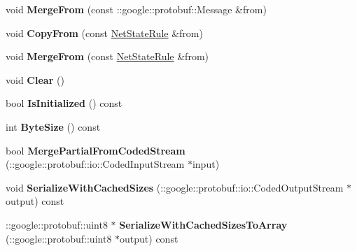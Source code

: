 \begin{DoxyCompactItemize}
void {\bfseries Merge\+From} (const \+::google\+::protobuf\+::\+Message \&from)
\item 
\mbox{\label{classcaffe_1_1_net_state_rule_a3048792ef3e75b81e466f8077213fba8}} 
void {\bfseries Copy\+From} (const \mbox{\hyperlink{classcaffe_1_1_net_state_rule}{Net\+State\+Rule}} \&from)
\item 
\mbox{\label{classcaffe_1_1_net_state_rule_a1fd3a109c8773f2be90f03468345856c}} 
void {\bfseries Merge\+From} (const \mbox{\hyperlink{classcaffe_1_1_net_state_rule}{Net\+State\+Rule}} \&from)
\item 
\mbox{\label{classcaffe_1_1_net_state_rule_a57622cba94a5ee5f78dbf04a33a02be3}} 
void {\bfseries Clear} ()
\item 
\mbox{\label{classcaffe_1_1_net_state_rule_ae839894e8e873564b8bace2cecdd16d7}} 
bool {\bfseries Is\+Initialized} () const
\item 
\mbox{\label{classcaffe_1_1_net_state_rule_ada1c84a2a56b7128d533401370e6dcd1}} 
int {\bfseries Byte\+Size} () const
\item 
\mbox{\label{classcaffe_1_1_net_state_rule_ae713924a94414953f545e076532ba1b8}} 
bool {\bfseries Merge\+Partial\+From\+Coded\+Stream} (\+::google\+::protobuf\+::io\+::\+Coded\+Input\+Stream $\ast$input)
\item 
\mbox{\label{classcaffe_1_1_net_state_rule_a0c123cc511c52b810872514165fec06a}} 
void {\bfseries Serialize\+With\+Cached\+Sizes} (\+::google\+::protobuf\+::io\+::\+Coded\+Output\+Stream $\ast$output) const
\item 
\mbox{\label{classcaffe_1_1_net_state_rule_acd7aca0b7c55ed4c0620b5b3e0c84720}} 
\+::google\+::protobuf\+::uint8 $\ast$ {\bfseries Serialize\+With\+Cached\+Sizes\+To\+Array} (\+::google\+::protobuf\+::uint8 $\ast$output) const
\item 
\mbox{\label{classcaffe_1_1_net_state_rule_ad862dcdfd6a79092f740235fad43cc0c}} 

\end{DoxyCompactItemize}
